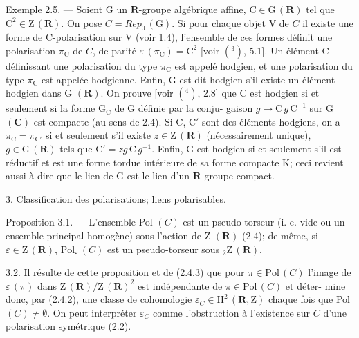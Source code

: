Exemple 2.5. --- Soient G un $\mathbf{R}$-groupe algébrique affine, $\mathrm{C} \in \mathrm{G}\,(\mathbf{R})$ tel
que $\mathrm{C}^2 \in \mathrm{Z}\,(\mathbf{R})$. On pose $C = Rep_0\,(\mathrm{G})$. Si pour chaque objet V de $C$
il existe une forme de C-polarisation sur V (voir 1.4), l'ensemble de ces
formes définit une polarisation $\pi_{\mathrm{C}}$ de $C$, de parité $\varepsilon\,(\pi_{\mathrm{C}}) = \mathrm{C}^2$ [voir $(^3)$, 5.1].
Un élément C définissant une polarisation du type $\pi_{\mathrm{C}}$ est appelé hodgien,
et une polarisation du type $\pi_{\mathrm{C}}$ est appelée hodgienne. Enfin, G est dit
hodgien s'il existe un élément hodgien dans G $(\mathbf{R})$. On prouve [voir $(^4)$, 2.8]
que C est hodgien si et seulement si la forme $\mathrm{G}_{\mathrm{C}}$ de G définie par la conju-%
gaison $g \mapsto \mathrm{C}\,\bar{g}\,\mathrm{C}^{-1}$ sur G $(\mathbf{C})$ est compacte (au sens de 2.4). Si C, C$'$ sont
des éléments hodgiens, on a $\pi_{\mathrm{C}} = \pi_{\mathrm{C}'}$ si et seulement s'il existe $z \in \mathrm{Z}\,(\mathbf{R})$
(nécessairement unique), $g \in \mathrm{G}\,(\mathbf{R})$ tels que $\mathrm{C}' = zg\,\mathrm{C}\,g^{-1}$. Enfin, G est
hodgien si et seulement s'il est réductif et est une forme tordue intérieure
de sa forme compacte K; ceci revient aussi à dire que le lien de G est le
lien d'un $\mathbf{R}$-groupe compact.

3. Classification des polarisations; liens polarisables.

Proposition 3.1. --- L'ensemble Pol $(C)$ est un pseudo-torseur (i. e. vide
ou un ensemble principal homogène) sous l'action de Z $(\mathbf{R})$ (2.4); de même,
si $\varepsilon \in \mathrm{Z}\,(\mathbf{R})$, $\mathrm{Pol}_{\varepsilon}\,(C)$ est un pseudo-torseur sous ${}_2\mathrm{Z}\,(\mathbf{R})$.

3.2. Il résulte de cette proposition et de (2.4.3) que pour $\pi \in \mathrm{Pol}\,(C)$
l'image de $\varepsilon\,(\pi)$ dans $\mathrm{Z}\,(\mathbf{R})/\mathrm{Z}\,(\mathbf{R})^2$ est indépendante de $\pi \in \mathrm{Pol}\,(C)$ et déter-%
mine donc, par (2.4.2), une classe de cohomologie $\varepsilon_C \in \mathrm{H}^2\,(\mathbf{R}, \mathrm{Z})$ chaque fois
que Pol $(C) \neq \emptyset$. On peut interpréter $\varepsilon_C$ comme l'obstruction à l'existence
sur $C$ d'une polarisation symétrique (2.2).

